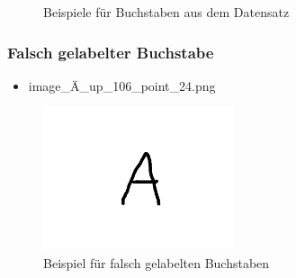 \documentclass{beamer}
\begin{document}
\begin{frame}
\begin{figure}
		\caption{Beispiele für Buchstaben aus dem Datensatz}
		\label{fig:charexample}
	\end{figure}
\end{frame}

\begin{frame}
	\frametitle{Falsch gelabelter Buchstabe}
	\begin{itemize}
		\item \glqq image\_Ä\_up\_106\_point\_24.png\grqq
	\end{itemize}
	\begin{figure}
		\includegraphics[width=0.5\textwidth]{hand_images/image_Ae_up_106_point_24.png}
	
		\caption{Beispiel für falsch gelabelten Buchstaben }
		\label{fig:wrongcharexample}
	\end{figure}
\end{frame}
\end{document}
